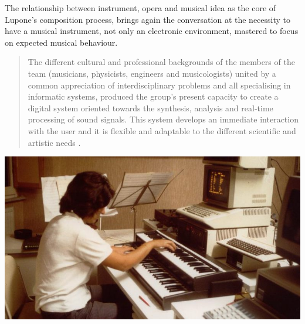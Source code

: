 \documentclass[
	a0,
	portrait
	]{a0poster}
\begin{document}
\begin{multicols}{4}

The relationship between instrument, opera and musical idea as the core of Lupone's composition process, brings again the conversation at the necessity to have a musical instrument, not only an electronic environment, mastered to focus on expected musical behaviour. 

\vfill

\begin{quotation}
\begin{it}
\begin{flushright}
\noindent The different cultural and professional backgrounds of the members of the team (musicians, physicists, engineers and musicologists) united by a common appreciation of interdisciplinary problems and all specialising in informatic systems, produced the group's present capacity to create a digital system oriented towards the synthesis, analysis and real-time processing of sound signals. This system develops an immediate interaction with the user and it is flexible and adaptable to the different scientific and artistic needs \cite{ml91}.
\end{flushright}
\end{it}
\end{quotation}

\columnbreak


\begin{center}
\includegraphics[width=1.\linewidth]{Fly10_Apple1}
\end{center}


\end{multicols}
\end{document}
